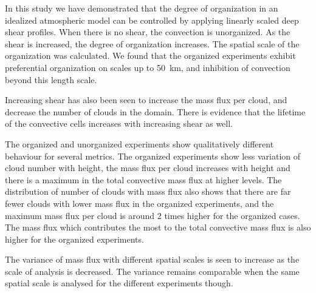 \documentclass[11pt,a4paper]{article}
\begin{document}
In this study we have demonstrated that the degree of organization in an idealized atmospheric model can be controlled by applying linearly scaled deep shear profiles. When there is no shear, the convection is unorganized. As the shear is increased, the degree of organization increases. The spatial scale of the organization was calculated. We found that the organized experiments exhibit preferential organization on scales up to \SI{50}{km}, and inhibition of convection beyond this length scale.

Increasing shear has also been seen to increase the mass flux per cloud, and decrease the number of clouds in the domain. There is evidence that the lifetime of the convective cells increases with increasing shear as well.

The organized and unorganized experiments show qualitatively different behaviour for several metrics. The organized experiments show less variation of cloud number with height, the mass flux per cloud increases with height and there is a maximum in the total convective mass flux at higher levels. The distribution of number of clouds with mass flux also shows that there are far fewer clouds with lower mass flux in the organized experiments, and the maximum mass flux per cloud is around 2 times higher for the organized cases. The mass flux which contributes the most to the total convective mass flux is also higher for the organized experiments.

The variance of mass flux with different spatial scales is seen to increase as the scale of analysis is decreased. The variance remains comparable when the same spatial scale is analysed for the different experiments though.
\end{document}
